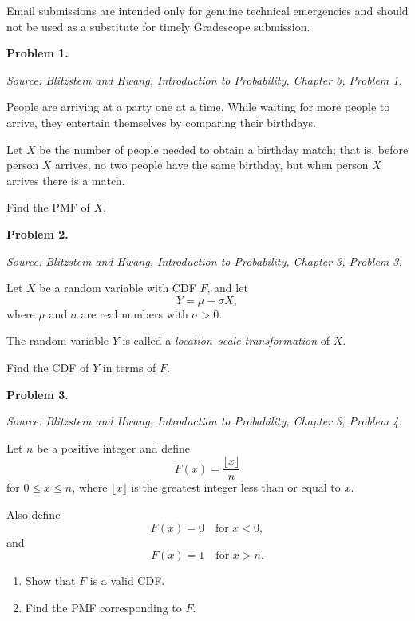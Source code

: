 \documentclass[11pt]{article}
\newcommand{\source}[1]{%
    \vspace{0.15cm}
    {\small\textit{Source: Blitzstein and Hwang, \textit{Introduction to Probability}, Chapter 3, Problem #1.}}
}
\begin{document}
Email submissions are intended only for genuine technical emergencies and should not be used as a substitute for timely Gradescope submission.

\newpage


\begin{problemheader}
\textbf{Problem 1. }
\end{problemheader}
\source{1}

People are arriving at a party one at a time. While waiting for more people to arrive, they entertain themselves by comparing their birthdays.

Let $X$ be the number of people needed to obtain a birthday match; that is, before person $X$ arrives, no two people have the same birthday, but when person $X$ arrives there is a match.

Find the PMF of $X$.

\vfill

\newpage


\begin{problemheader}
\textbf{Problem 2. }
\end{problemheader}
\source{3}

Let $X$ be a random variable with CDF $F$, and let
\[
Y=\mu+\sigma X,
\]
where $\mu$ and $\sigma$ are real numbers with $\sigma>0$.

The random variable $Y$ is called a \emph{location--scale transformation} of $X$.

Find the CDF of $Y$ in terms of $F$.

\vfill

\newpage


\begin{problemheader}
\textbf{Problem 3. }
\end{problemheader}
\source{4}

Let $n$ be a positive integer and define
\[
F(x)=\frac{\lfloor x\rfloor}{n}
\]
for $0\le x\le n$, where $\lfloor x\rfloor$ is the greatest integer less than or equal to $x$.

Also define
\[
F(x)=0 \quad \text{for } x<0,
\]
and
\[
F(x)=1 \quad \text{for } x>n.
\]

\begin{enumerate}[label=(\alph*), leftmargin=*]
    \item Show that $F$ is a valid CDF.

    \item Find the PMF corresponding to $F$.
\end{enumerate}
\end{document}
